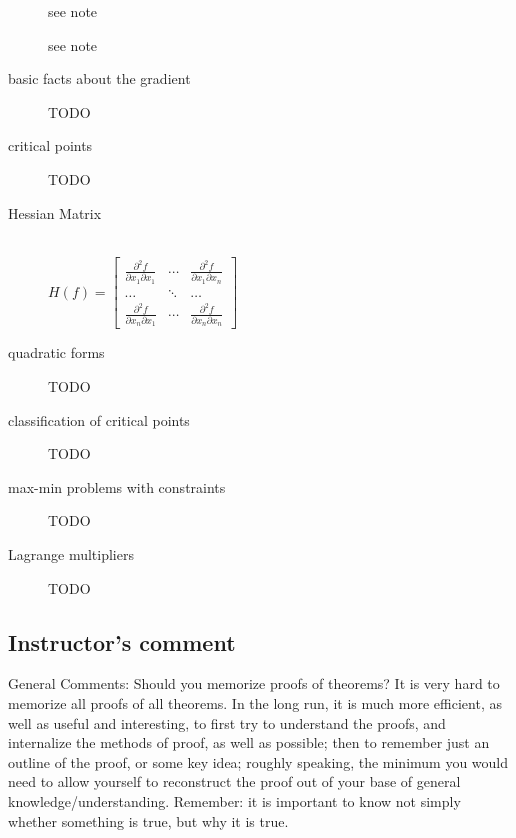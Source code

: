 \begin{description}
\item[] see note
\item[] see note
\item[basic facts about the gradient] TODO
\item[critical points] TODO
\item[Hessian Matrix]\hfill\\
$H(f) = \begin{bmatrix}
\frac{\partial^2 f}{\partial x_1\partial x_1} & \cdots & \frac{\partial^2 f}{\partial x_1\partial x_n}\\
\ldots & \ddots & \ldots \\
\frac{\partial^2 f}{\partial x_n\partial x_1} & \cdots & \frac{\partial^2 f}{\partial x_n\partial x_n}
\end{bmatrix}$
\item[quadratic forms] TODO
\item[classification of critical points] TODO
\item[max-min problems with constraints] TODO
\item[Lagrange multipliers] TODO
\end{description}



\subsection{Instructor's comment}
General Comments: Should you memorize proofs of theorems? It is very hard to
memorize all proofs of all theorems. In the long run, it is much more efficient, as well
as useful and interesting, to first try to understand the proofs, and internalize the
methods of proof, as well as possible; then to remember just an outline of the proof,
or some key idea; roughly speaking, the minimum you would need to allow yourself
to reconstruct the proof out of your base of general knowledge/understanding.
Remember: it is important to know not simply whether something is true, but why
it is true.




